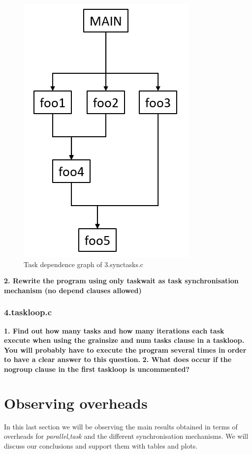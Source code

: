 \documentclass[12]{article}
\begin{document}
\begin{figure}[H]
\centering
\includegraphics[scale=0.5]{images/task_dependence_graph_synctasks.png}
\caption{Task dependence graph of 3.synctasks.c}
\label{task_dependence_graph_synctasks}
\end{figure}

\textbf{2. Rewrite the program using only taskwait as task synchronisation mechanism (no depend clauses allowed)}
\subsubsection{4.taskloop.c}
\textbf{1. Find out how many tasks and how many iterations each task execute when using the grainsize
and num tasks clause in a taskloop. You will probably have to execute the program several times in order to have a clear answer to this question.}
\textbf{2. What does occur if the nogroup clause in the first taskloop is uncommented?}

\section{Observing overheads}
In this last section we will be observing the main results obtained in terms of overheads for \textit{parallel},\textit{task} and the different synchronisation mechanisms. We will discuss our conclusions and support them with tables and plots.
\end{document}
